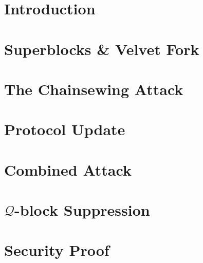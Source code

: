 \section{Introduction}


\section{Superblocks \& Velvet Fork}


\section{The Chainsewing Attack}


\section{Protocol Update}


\section{Combined Attack}


\section{$\mathcal{Q}$-block Suppression}


\section{Security Proof}




\begin{acks}
\end{acks}
